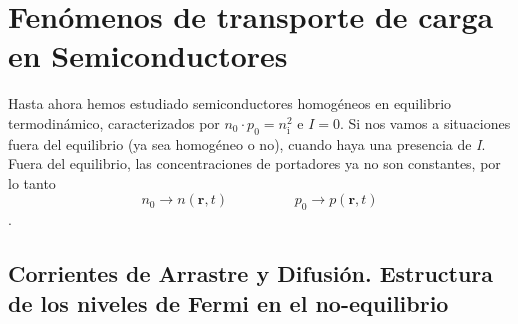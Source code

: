 \pagestyle{fancy}
\chapter{Fenómenos de transporte de carga en Semiconductores}
Hasta ahora hemos estudiado semiconductores homogéneos en equilibrio termodinámico, caracterizados por $n_0\cdot p_0=n_\mathrm{i}^2$ e $I=0$. Si nos vamos a situaciones fuera del equilibrio (ya sea homogéneo o no), cuando haya una presencia de \textit{I}. Fuera del equilibrio, las concentraciones de portadores ya no son constantes, por lo tanto $$n_0 \xrightarrow{} n(\mathbf{r},t) \hspace{2cm} p_0 \xrightarrow{} p(\mathbf{r},t)$$.
\section{Corrientes de Arrastre y Difusión. Estructura de los niveles de Fermi en el no-equilibrio} \label{sec: Corrientes de difusión y arrastre}
